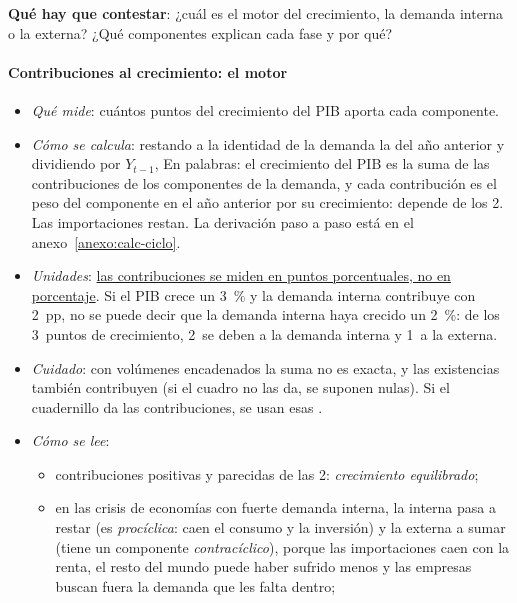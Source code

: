 \documentclass[11pt]{article}
\begin{document}
\begin{ideaclave}
\textbf{Qué hay que contestar}: ¿cuál es el motor del crecimiento, la demanda interna o la externa? ¿Qué componentes explican cada fase y por qué?
\end{ideaclave}

\paragraph{Contribuciones al crecimiento: el motor}
\begin{itemize}
\item \emph{Qué mide}: cuántos puntos del crecimiento del PIB aporta cada componente.
\item \emph{Cómo se calcula}: restando a la identidad de la demanda la del año anterior y dividiendo por $Y_{t-1}$,
En palabras: el crecimiento del PIB es la suma de las contribuciones de los componentes de la demanda, y cada contribución es el peso del componente en el año anterior por su crecimiento: depende de los 2. Las importaciones restan. La derivación paso a paso está en el anexo~\ref{anexo:calc-ciclo}.
\item \emph{Unidades}: \uline{las contribuciones se miden en puntos porcentuales, no en porcentaje}. Si el PIB crece un 3~\% y la demanda interna contribuye con 2~pp, no se puede decir que la demanda interna haya crecido un 2~\%: de los 3~puntos de crecimiento, 2~se deben a la demanda interna y 1~a la externa.
\item \emph{Cuidado}: con volúmenes encadenados la suma no es exacta, y las existencias también contribuyen (si el cuadro no las da, se suponen nulas). Si el cuadernillo da las contribuciones, se usan esas \parencite{Eurostat2026nama10gdp}.
\item \emph{Cómo se lee}:
  \begin{itemize}
  \item contribuciones positivas y parecidas de las 2: \emph{crecimiento equilibrado};
  \item en las crisis de economías con fuerte demanda interna, la interna pasa a restar (es \emph{procíclica}: caen el consumo y la inversión) y la externa a sumar (tiene un componente \emph{contracíclico}), porque las importaciones caen con la renta, el resto del mundo puede haber sufrido menos y las empresas buscan fuera la demanda que les falta dentro;

\end{itemize}
\end{itemize}
\end{document}
